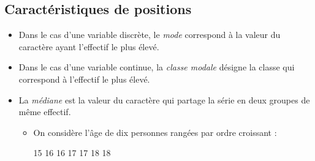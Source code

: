                   \subsection{Caract\'eristiques de positions}
                        \begin{defi}
                              \begin{itemize}
                                    \item Dans le cas d'une variable discr\`ete,
                                          le \emph{mode} correspond \`a la valeur du caract\`ere 
                                          ayant l'effectif le plus \'elev\'e.
                                    \item Dans le cas d'une variable continue,
                                          la \emph{classe modale} d\'esigne la classe 
                                          qui correspond \`a l'effectif le plus \'elev\'e.
                                    \item La \emph{m\'ediane} est la valeur du caract\`ere qui partage
                                          la s\'erie en deux groupes de m\^eme effectif.
                                          \begin{ex}
                                                \begin{itemize}
                                                      \item On consid\`ere l'\^age de dix personnes
                                                            rang\'ees par ordre croissant :
                                                            \begin{center}
                                                                  15 
                                                                  16 
                                                                  16 
                                                                  17 
                                                                  17 
                                                                  18 
                                                                  18 

\end{center}
\end{itemize}
\end{ex}
\end{itemize}
\end{defi}
